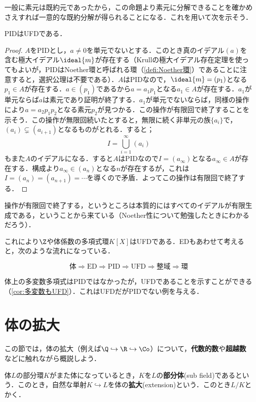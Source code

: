 一般に素元は既約元であったから，この命題より素元に分解できることを確かめさえすれば一意的な既約分解が得られることになる．これを用いて次を示そう．
\begin{thm}
	PIDはUFDである．
\end{thm}

\begin{proof}
	$A$をPIDとし，$a\neq0$を単元でないとする．このとき真のイデアル$(a)$を含む極大イデアル$\ideal{m}$が存在する（Krullの極大イデアル存在定理を使ってもよいが，PIDはNoether環と呼ばれる環（\ref{defi:Noether環}）であることに注意すると，選択公理は不要である）．$A$はPIDなので，$\ideal{m}=(p_1)$となる$p_1\in A$が存在する．$a\in(p_1)$であるから$a=a_1p_1$となる$a_1\in A$が存在する．$a_1$が単元ならば$a$は素元であり証明が終了する．$a_1$が単元でないならば，同様の操作により$a=a_2p_1p_2$となる素元$p_2$が見つかる．この操作が有限回で終了することを示そう．この操作が無限回続いたとすると，無限に続く非単元の族$\{a_i\}$で，$(a_i)\subsetneq (a_{i+1})$となるものがとれる．すると；
	\[I=\bigcup_{i=1}^\infty (a_i)\]
	もまた$A$のイデアルになる．すると$A$はPIDなので$I=(a_\infty)$となる$a_\infty\in A$が存在する．構成より$a_\infty\in (a_n)$となる$n$が存在するが，これは$I=(a_n)=(a_{n+1})=\cdots$を導くので矛盾．よってこの操作は有限回で終了する．
\end{proof}

操作が有限回で終了する，というところは本質的にはすべてのイデアルが有限生成である，ということから来ている（Noether性について勉強したときにわかるだろう）．

これにより$\Z$や体係数の多項式環$K[X]$はUFDである．EDもあわせて考えると，次のような流れになっている．

\[\text{体}\Longrightarrow\text{ED}\Longrightarrow\text{PID}\Longrightarrow\text{UFD}\Longrightarrow\text{整域}\Longrightarrow\text{環}\]

体上の多変数多項式はPIDではなかったが，UFDであることを示すことができる（\ref{cor:多変数もUFD}）．これはUFDだがPIDでない例を与える．

\section{体の拡大}

この節では，体の拡大（例えば$\Q\hookrightarrow\R\hookrightarrow\Co$）について，\textbf{代数的数}や\textbf{超越数}などに触れながら概説しよう．

体$L$の部分環$K$がまた体になっているとき，$K$を$L$の\textbf{部分体}(sub field)であるという．このとき，自然な単射$K\hookrightarrow L$を体の\textbf{拡大}(extension)という．このとき$L/K$とかく．

